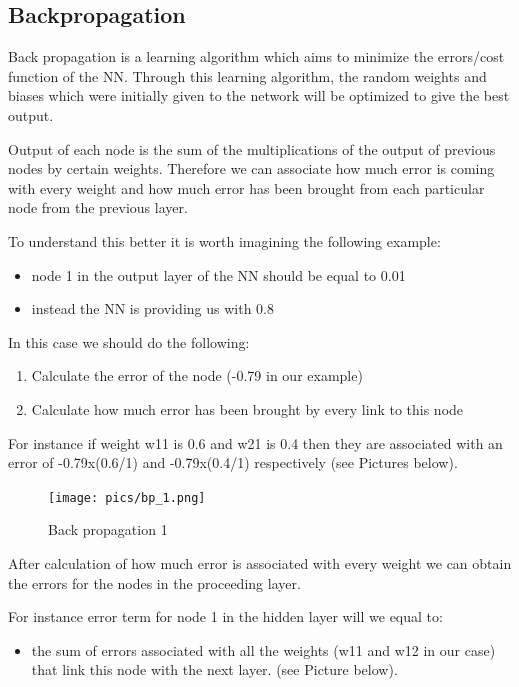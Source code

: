 \subsection{Backpropagation}

Back propagation is a learning algorithm which aims to minimize the errors/cost function of the NN. Through this learning algorithm, the random weights and biases which were initially given to the network will be optimized to give the best output.

Output of each node is the sum of the multiplications of the output of previous nodes by certain weights. Therefore we can associate how much error is coming with every weight and how much error has been brought from each particular node from the previous layer.

To understand this better it is worth imagining the following example:
\begin{itemize}
   \item  node 1 in the output layer of the NN should be equal to 0.01
   \item  instead the NN is providing us with 0.8
\end{itemize}

In this case we should do the following:
\begin{enumerate}
   \item Calculate the error of the node (-0.79 in our example)
   \item Calculate how much error has been brought by every link to this node
\end{enumerate}

For instance if weight w11 is 0.6 and w21 is 0.4 then they are associated with an error of -0.79x(0.6/1) and -0.79x(0.4/1) respectively (see Pictures below).

\begin{figure}[H]
    \texttt{[image: pics/bp\_1.png]}
    \caption{\label{fig:bp1} Back propagation 1}
\end{figure}

After calculation of how much error is associated with every weight we can obtain the errors for the nodes in the proceeding layer.
 
For instance error term for node 1 in the hidden layer will we equal to:
\begin{itemize}
   \item the sum of errors associated with all the weights (w11 and w12 in our case) that link this node with the next layer. (see Picture below).
\end{itemize}

